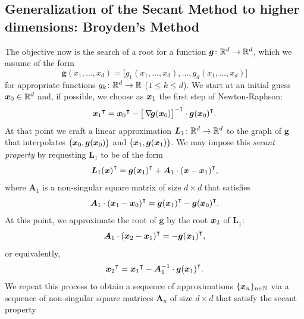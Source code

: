 \subsection{Generalization of the Secant Method to higher dimensions: Broyden's Method}
The objective now is the search of a root for a function $\boldsymbol{g} \colon \mathbb{R}^d \to \mathbb{R}^d$, which we assume of the form 
\begin{equation*}
\boldsymbol{g}(x_1, \dotsc, x_d) = \big[ g_1(x_1, \dotsc, x_d), \dotsc, g_d(x_1, \dotsc, x_d) \big]
\end{equation*}
for appropriate functions $g_k \colon \mathbb{R}^d \to \mathbb{R}$ ($1 \leq k \leq d$).  We start at an initial guess $\boldsymbol{x}_0 \in \mathbb{R}^d$ and, if possible, we choose as $\boldsymbol{x}_1$ the first step of Newton-Raphson: 
\begin{equation*}
{\boldsymbol{x}_1}^\intercal = {\boldsymbol{x}_0}^\intercal - \big[ \mathop{\nabla\! {\boldsymbol{g}}}(\boldsymbol{x}_0) \big]^{-1} \cdot {\boldsymbol{g}(\boldsymbol{x}_0)}^\intercal.
\end{equation*}
At that point we craft a linear approximation $\boldsymbol{L}_1 \colon \mathbb{R}^d \to \mathbb{R}^d$ to the graph of $\boldsymbol{g}$ that interpolates $\big( \boldsymbol{x}_0, \boldsymbol{g}(\boldsymbol{x}_0) \big)$ and $\big( \boldsymbol{x}_1, \boldsymbol{g}(\boldsymbol{x}_1) \big)$.  We may impose this \emph{secant property} by requesting $\boldsymbol{L}_1$ to be of the form
\begin{equation*}
{\boldsymbol{L}_1(\boldsymbol{x})}^\intercal = {\boldsymbol{g}(\boldsymbol{x}_1)}^\intercal + \boldsymbol{A}_1 \cdot {(\boldsymbol{x}- \boldsymbol{x}_1)}^\intercal,
\end{equation*}
where $\boldsymbol{A}_1$ is a non-singular square matrix of size $d \times d$ that satisfies
\begin{equation*}
\boldsymbol{A}_1 \cdot {(\boldsymbol{x}_1 - \boldsymbol{x}_0)}^\intercal = {\boldsymbol{g}(\boldsymbol{x}_1)}^\intercal - {\boldsymbol{g}(\boldsymbol{x}_0)}^\intercal.
\end{equation*}
At this point, we approximate the root of $\boldsymbol{g}$ by the root $\boldsymbol{x}_2$ of $\boldsymbol{L}_1$:
\begin{equation*}
\boldsymbol{A}_1 \cdot {(\boldsymbol{x}_2 - \boldsymbol{x}_1)}^\intercal = -{\boldsymbol{g}(\boldsymbol{x}_1)}^\intercal,
\end{equation*}
or equivalently,
\begin{equation*}
{\boldsymbol{x}_2}^\intercal = {\boldsymbol{x}_1}^\intercal - \boldsymbol{A}_1^{-1} \cdot {\boldsymbol{g}(\boldsymbol{x}_1)}^\intercal.
\end{equation*}
We repeat this process to obtain a sequence of approximations $\{ \boldsymbol{x}_n \}_{n \in \mathbb{N}}$ via a sequence of non-singular square matrices $\boldsymbol{A}_n$ of size $d \times d$ that satisfy the secant property

